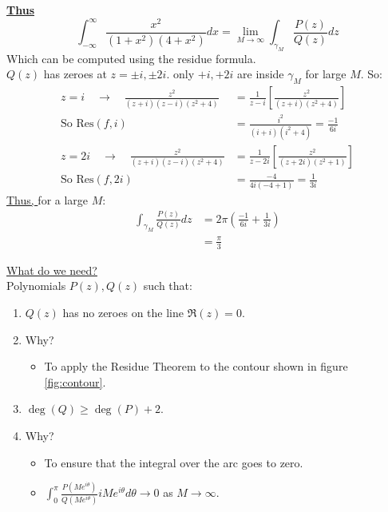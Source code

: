 \begin{example}
    \textbf{\underline{Thus}}
    \begin{equation*}
        \int_{-\infty}^{\infty} \frac{x^2}{(1 + x^2)(4 + x^2)} dx = \lim_{M \to \infty} \int_{\gamma_M} \frac{P(z)}{Q(z)} dz
    \end{equation*}
    Which can be computed using the residue formula. \\
    $Q(z)$ has zeroes at $z = \pm i, \pm 2i$. only $+i, +2i$ are inside $\gamma_M$ for large $M$. So:
    \begin{align*}
        \boxed{z = i} \quad \rightarrow\quad \frac{z^2}{(z + i)(z-i)(z^2 + 4)}  & = \frac{1}{z - i}\left[\frac{z^2}{(z + i)(z^2 + 4)}\right]   \\
        \text{So Res}(f, i)                                                     & = \frac{i^2}{(i + i)(i^2 + 4)} = \frac{-1}{6i}               \\
        \boxed{z = 2i}\quad \rightarrow \quad \frac{z^2}{(z + i)(z-i)(z^2 + 4)} & = \frac{1}{z - 2i}\left[\frac{z^2}{(z + 2i)(z^2 + 1)}\right] \\
        \text{So Res}(f, 2i)                                                    & = \frac{-4}{4i(-4 + 1)} = \frac{1}{3i}
    \end{align*}
    \underline{Thus, } for a large $M$:
    \begin{align*}
        \int_{\gamma_M} \frac{P(z)}{Q(z)} dz & = 2\pi \left(\frac{-1}{6i} + \frac{1}{3i}\right) \\
                                             & = \frac{\pi}{3}
    \end{align*}
\end{example}

\begin{theorem}
    \underline{What do we need?} \\
    Polynomials $P(z), Q(z)$ such that:
    \begin{enumerate}
        \item $Q(z)$ has no zeroes on the line $\Re(z) = 0$.
        \item[] Why?
              \begin{itemize}
                  \item To apply the Residue Theorem to the contour shown in figure \ref{fig:contour}.
              \end{itemize}
        \item $\deg(Q) \geq \deg(P) + 2$.
        \item[] Why?
              \begin{itemize}
                  \item To ensure that the integral over the arc goes to zero.
                  \item $\int_0^\pi \frac{P(Me^{i\theta})}{Q(Me^{i\theta})} i M e^{i\theta} d\theta \to 0$ as $M \to \infty$.
              \end{itemize}
    \end{enumerate}

\end{theorem}

